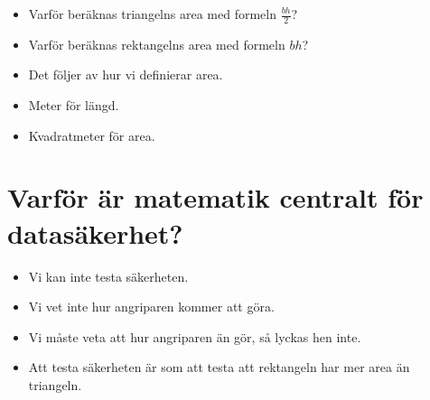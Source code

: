 \begin{frame}
  \begin{question}
    \begin{itemize}
      \item Varför beräknas triangelns area med formeln \(\frac{bh}{2}\)?
      \item Varför beräknas rektangelns area med formeln \(bh\)?
    \end{itemize}
  \end{question}
\end{frame}

\begin{frame}
  \begin{solution}
    \begin{itemize}
      \item Det följer av hur vi definierar area.
      \item Meter för längd.
      \item Kvadratmeter för area.
    \end{itemize}
  \end{solution}

%
\end{frame}

\section{Varför är matematik centralt för datasäkerhet?}

\begin{frame}
  \begin{remark}
    \begin{itemize}
      \item Vi kan inte testa säkerheten.
      \item Vi vet inte hur angriparen kommer att göra.
      \item Vi måste veta att hur angriparen än gör, så lyckas hen inte.
    \end{itemize}
  \end{remark}

  \pause

  \begin{example}
    \begin{itemize}
      \item Att testa säkerheten är som att testa att rektangeln har mer area 
        än triangeln.
    \end{itemize}
  \end{example}
\end{frame}

